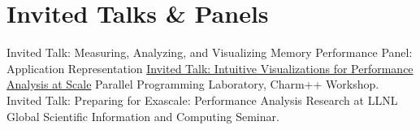 \section{Invited Talks \& Panels}
		{\newline Invited Talk: Measuring, Analyzing, and Visualizing Memory Performance}
		{}{}{}
		{\newline Panel: Application Representation}
		{}{}{}
		{\href{https://www.youtube.com/watch?v=8rJ4231hq9g}
		 {Invited Talk: Intuitive Visualizations for Performance Analysis at Scale}}
		{}{}{Parallel Programming Laboratory, Charm++ Workshop.}
		{Invited Talk: Preparing for Exascale: Performance Analysis Research at LLNL}
		{}{}
		{Global Scientific Information and Computing Seminar.}
